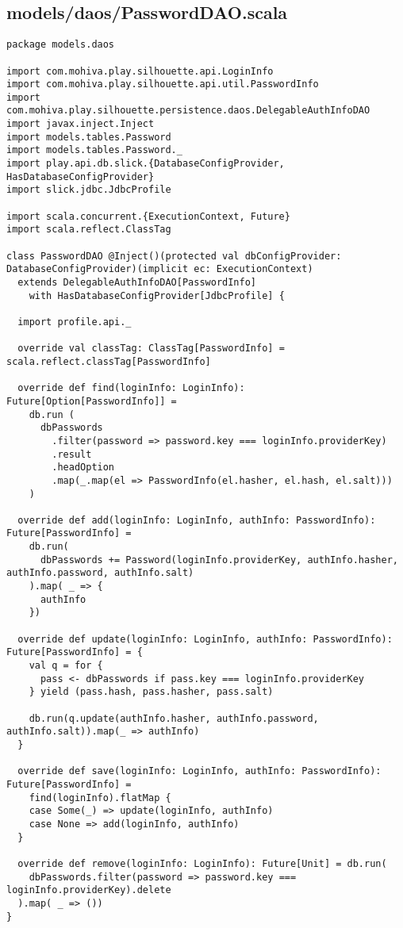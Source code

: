 \subsection{models/daos/PasswordDAO.scala}
\begin{lstlisting}
package models.daos

import com.mohiva.play.silhouette.api.LoginInfo
import com.mohiva.play.silhouette.api.util.PasswordInfo
import com.mohiva.play.silhouette.persistence.daos.DelegableAuthInfoDAO
import javax.inject.Inject
import models.tables.Password
import models.tables.Password._
import play.api.db.slick.{DatabaseConfigProvider, HasDatabaseConfigProvider}
import slick.jdbc.JdbcProfile

import scala.concurrent.{ExecutionContext, Future}
import scala.reflect.ClassTag

class PasswordDAO @Inject()(protected val dbConfigProvider: DatabaseConfigProvider)(implicit ec: ExecutionContext)
  extends DelegableAuthInfoDAO[PasswordInfo]
    with HasDatabaseConfigProvider[JdbcProfile] {

  import profile.api._

  override val classTag: ClassTag[PasswordInfo] = scala.reflect.classTag[PasswordInfo]

  override def find(loginInfo: LoginInfo): Future[Option[PasswordInfo]] =
    db.run (
      dbPasswords
        .filter(password => password.key === loginInfo.providerKey)
        .result
        .headOption
        .map(_.map(el => PasswordInfo(el.hasher, el.hash, el.salt)))
    )

  override def add(loginInfo: LoginInfo, authInfo: PasswordInfo): Future[PasswordInfo] =
    db.run(
      dbPasswords += Password(loginInfo.providerKey, authInfo.hasher, authInfo.password, authInfo.salt)
    ).map( _ => {
      authInfo
    })

  override def update(loginInfo: LoginInfo, authInfo: PasswordInfo): Future[PasswordInfo] = {
    val q = for {
      pass <- dbPasswords if pass.key === loginInfo.providerKey
    } yield (pass.hash, pass.hasher, pass.salt)

    db.run(q.update(authInfo.hasher, authInfo.password, authInfo.salt)).map(_ => authInfo)
  }

  override def save(loginInfo: LoginInfo, authInfo: PasswordInfo): Future[PasswordInfo] =
    find(loginInfo).flatMap {
    case Some(_) => update(loginInfo, authInfo)
    case None => add(loginInfo, authInfo)
  }

  override def remove(loginInfo: LoginInfo): Future[Unit] = db.run(
    dbPasswords.filter(password => password.key === loginInfo.providerKey).delete
  ).map( _ => ())
}

\end{lstlisting}
